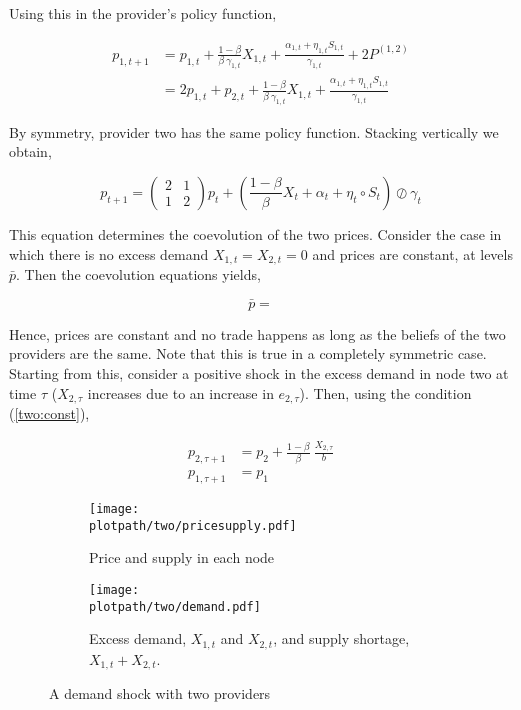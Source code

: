 Using this in the provider's policy function,

\begin{equation*}
  \begin{split}
    p_{1, t+1} &= p_{1, t} + \frac{1-\beta}{\beta \ \gamma_{1, t}} X_{1, t} + \frac{\alpha_{1, t} + \eta_{1, t} S_{1, t}}{\gamma_{1, t}} + 2P^{(1, 2)} \\
    &= 2p_{1, t} + p_{2, t} + \frac{1-\beta}{\beta \ \gamma_{1, t}} X_{1, t} + \frac{\alpha_{1, t} + \eta_{1, t} S_{1, t}}{\gamma_{1, t}}
  \end{split}
\end{equation*}

By symmetry, provider two has the same policy function. Stacking vertically we obtain,

\begin{equation}
  p_{t+1} = \begin{pmatrix}
    2 & 1 \\
    1 & 2
  \end{pmatrix} p_t + \left( \frac{1-\beta}{\beta} X_t + \alpha_t + \eta_t \circ S_t \right) \oslash \gamma_t
\end{equation}

This equation determines the coevolution of the two prices. Consider the case in which there is no excess demand $X_{1, t} = X_{2, t} = 0$ and prices are constant, at levels $\bar{p}$. Then the coevolution equations yields,

\begin{equation} \label{two:const}
  \bar{p} =
\end{equation}

Hence, prices are constant and no trade happens as long as the beliefs of the two providers are the same. Note that this is true in a completely symmetric case. Starting from this, consider a positive shock in the excess demand in node two at time $\tau$ ($X_{2, \tau}$ increases due to an increase in $e_{2, \tau}$). Then, using the condition (\ref{two:const}),

\begin{equation}
  \begin{split}
    p_{2, \tau + 1} &= p_2 + \frac{1 - \beta}{\beta} \  \frac{X_{2, \tau}}{b} \\
    p_{1, \tau + 1} &= p_1
  \end{split}
\end{equation}


\begin{figure}[H]
  \begin{subfigure}{0.48\textwidth}
    \centering
    \texttt{[image: \\plotpath/two/pricesupply.pdf]}
    \caption{Price and supply in each node}
  \end{subfigure}
  \hfill
  \begin{subfigure}{0.48\textwidth}
    \centering
    \texttt{[image: \\plotpath/two/demand.pdf]}
    \caption{Excess demand, $X_{1, t}$ and $X_{2, t}$, and supply shortage, $X_{1, t} + X_{2, t}$.}
  \end{subfigure}
  \caption{A demand shock with two providers} \label{fig:two}
\end{figure}


